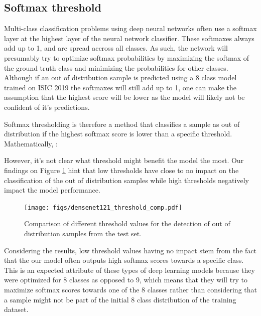     \subsection{Softmax threshold}
        Multi-class classification problems using deep neural networks often use a softmax layer at the highest layer of the neural network classifier. These softmaxes always add up to 1, and are spread accross all classes. As such, the network will presumably try to optimize softmax probabilities by maximizing the softmax of the ground truth class and minimizing the probabilities for other classes. Although if an out of distribution sample is predicted using a 8 class model trained on ISIC 2019 the softmaxes will still add up to 1, one can make the assumption that the highest score will be lower as the model will likely not be confident of it's predictions. \par
        
        Softmax thresholding is therefore a method that classifies a sample as out of distribution if the highest softmax score is lower than a specific threshold. Mathematically, :
        
        However, it's not clear what threshold might benefit the model the most. Our findings on Figure \ref{fig:densenet121_threshold_comp}  hint that low thresholds have close to no impact on the classification of the out of distribution samples while high thresholds negatively impact the model performance. 
        \begin{figure}[ht]
            \centering
            \texttt{[image: figs/densenet121\_threshold\_comp.pdf]}
            \caption{Comparison of different threshold values for the detection of out of distribution samples from the test set.}
            \label{fig:densenet121_threshold_comp}
        \end{figure}
        
        Considering the results, low threshold values having no impact stem from the fact that the our model often outputs high softmax scores towards a specific class. This is an expected attribute of these types of deep learning models because they were optimized for 8 classes as opposed to 9, which means that they will try to maximize softmax scores towards one of the 8 classes rather than considering that a sample might not be part of the initial 8 class distribution of the training dataset. \par
        
